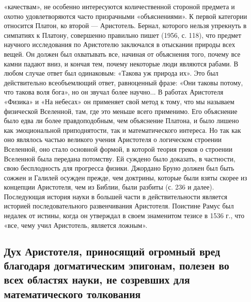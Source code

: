 «качествам», не особенно интересуются количественной стороной предмета
и охотно  удовлетворяются часто  призрачными «объяснениями».  К первой
категории относится Платон, ко второй --- Аристотель. Бернал, которого
нельзя  упрекнуть в  симпатиях к  Платону, совершенно  правильно пишет
(1956,  с.  118),  что  предмет научного  исследования  по  Аристотелю
заключался в  отыскании природы всех  вещей. Он должен  был охватывать
все,  начиная от  объяснения того,  почему  все камни  падают вниз,  и
кончая  тем, почему  некоторые люди  являются рабами.  В любом  случае
ответ был  одинаковым: «Такова уж  природа их». Это  был действительно
всеобъемлющий ответ, равноценный фразе: «Они таковы потому, что такова
воля бога», но он звучал более научно... В работах Аристотеля «Физика»
и  «На небесах»  он  применяет  свой метод  к  тому,  что мы  называем
физической  Вселенной,  там,  где  это  меньше  всего  применимо.  Его
объяснение было едва ли  более правдоподобным, чем объяснение Платона,
и было  лишено как эмоциональной приподнятости,  так и математического
интереса. Но так как оно  являлось частью великого учения Аристотеля о
логическом строении  Вселенной, оно  стало основной формой,  в которой
теория греков о строении Вселенной была передана потомству. Ей суждено
было доказать,  в частности,  свою бесплодность для  прогресса физики.
Джордано Бруно  должен был быть  сожжен и Галилей осужден  прежде, чем
доктрины, которые  были взяты скорее  из концепции Аристотеля,  чем из
Библии, были  разбиты (с.  236 и далее).  Последующая история  науки в
большей части  в действительности является  историей последовательного
развенчивания Аристотеля. Поистине Рамус  был недалек от истины, когда
он утверждал в своем знаменитом тезисе  в 1536 г., что «все, чему учил
Аристотель, является ложным».

\subsection{Дух   Аристотеля,  приносящий   огромный  вред   благодаря
догматическим эпигонам,  полезен во всех областях  науки, не созревших
для математического толкования}

